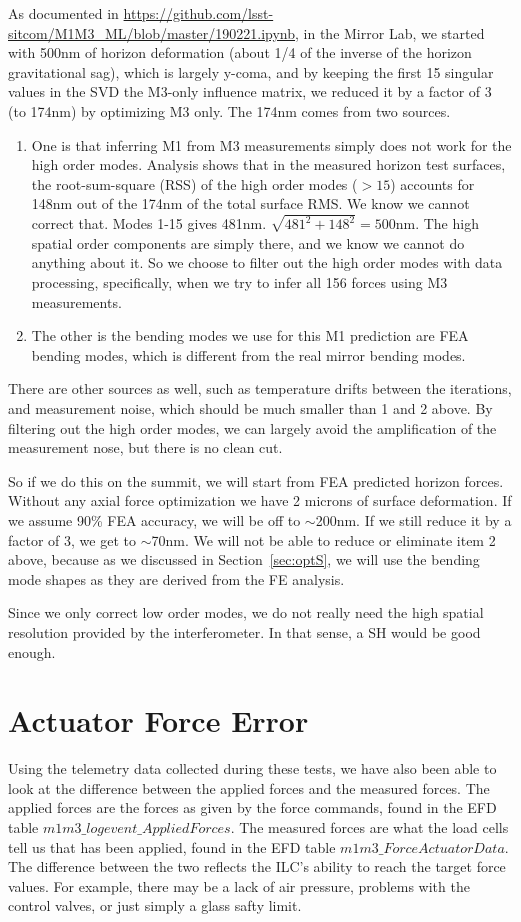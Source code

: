 \documentclass [twoside,openbib,12pt]{article}
\newcommand{\bnum}{\begin{enumerate}}
\newcommand{\enum}{\end{enumerate}}
\begin{document}
As documented in \url{https://github.com/lsst-sitcom/M1M3_ML/blob/master/190221.ipynb},
in the Mirror Lab, we started with 500nm of horizon deformation (about
1/4 of the inverse of the horizon gravitational sag), which is largely
y-coma, and by keeping the first 15 singular values in the SVD the M3-only
influence matrix, we reduced it by a factor of 3 (to 174nm) by optimizing M3
only.
The 174nm comes from two sources.
\bnum
\item One is that inferring M1 from M3 measurements simply does not work for the high order modes.
Analysis shows that in the measured horizon test surfaces, the
root-sum-square (RSS) of the high order modes ($>15$) accounts
for 148nm out of the 174nm of the total surface RMS.
We know we cannot correct that. Modes 1-15
gives 481nm.
$\sqrt{481^2+148^2}=500$nm.
The high spatial order components are simply there, and we know we
cannot do anything about it. So we choose to
 filter out the high order modes with data processing, specifically,
 when we try to infer all 156 forces using M3 measurements.
\item
The other is the bending modes we use for this M1 prediction are FEA
bending modes, which is different from the real mirror bending modes.
\enum
There are other sources as well, such as temperature drifts between
the iterations, and measurement noise, which should be much smaller
than 1 and 2 above. By filtering out the high order modes, we can
largely avoid the amplification of the measurement nose, but there is
no clean cut.

So if we do this on the summit, we will start from FEA predicted
horizon forces. Without any axial force optimization we have 2 microns
of surface deformation. If we assume 90\% FEA accuracy, we will be off
to $\sim$200nm. If we still reduce it by a factor of 3, we get to
$\sim$70nm.
We will not be able to reduce or eliminate item 2 above, because as
we discussed in Section~\ref{sec:optS}, we will use the bending mode
shapes as they are derived from the FE analysis.

Since we only correct low order modes, we do not really need the high
spatial resolution provided by the interferometer. In that sense, a SH
would be good enough.

\section{Actuator Force Error}
\label{sec:ferror}

Using the telemetry data collected during these tests, we have also
been able to look at the difference between the applied forces and the
measured forces.
The applied forces are the forces as given by the force commands,
found in the EFD table $m1m3\_logevent\_AppliedForces$.
The measured forces are what the load cells tell us that has been
applied, found in the EFD table $m1m3\_ForceActuatorData$.
The difference between the two reflects the ILC's ability to reach the
target force values. For example, there may be a lack of air pressure, problems
with the control valves, or just simply a glass safty limit.
\end{document}
